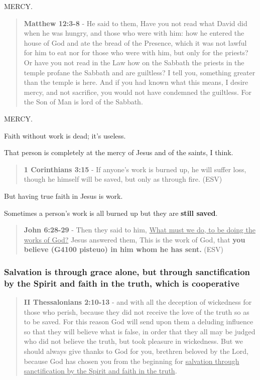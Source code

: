 \documentclass[11pt]{article}
\begin{document}
MERCY.

\begin{quote}
\textbf{Matthew 12:3-8} - He said to them, Have you not read what David did when he was hungry, and those who were with him: how he entered the house of God and ate the bread of the Presence, which it was not lawful for him to eat nor for those who were with him, but only for the priests? Or have you not read in the Law how on the Sabbath the priests in the temple profane the Sabbath and are guiltless? I tell you, something greater than the temple is here. And if you had known what this means, I desire mercy, and not sacrifice, you would not have condemned the guiltless. For the Son of Man is lord of the Sabbath.
\end{quote}

MERCY.

Faith without work is dead; it's useless.

That person is completely at the mercy of Jesus and of the saints, I think.

\begin{quote}
\textbf{1 Corinthians 3:15} - If anyone's work is burned up, he will suffer loss, though he himself will be saved, but only as through fire. (ESV)
\end{quote}

But having true faith in Jesus is work.

Sometimes a person's work is all burned up but they are \textbf{still saved}.

\begin{quote}
\textbf{John 6:28-29} - Then they said to him, \uline{What must we do, to be doing the works of God?} Jesus answered them, This is the work of God, that \textbf{you believe (G4100 pisteuo) in him whom he has sent.} (ESV)
\end{quote}

\subsubsection{Salvation is through grace alone, but through sanctification by the Spirit and faith in the truth, which is cooperative}
\label{sec:org7267cc1}

\begin{quote}
\textbf{II Thessalonians 2:10-13} - and with all the deception of wickedness for those who perish, because they did not receive the love of the truth so as to be saved. For this reason God will send upon them a deluding influence so that they will believe what is false, in order that they all may be judged who did not believe the truth, but took pleasure in wickedness. But we should always give thanks to God for you, brethren beloved by the Lord, because God has chosen you from the beginning for \uline{salvation through sanctification by the Spirit and faith in the truth}.
\end{quote}
\end{document}
